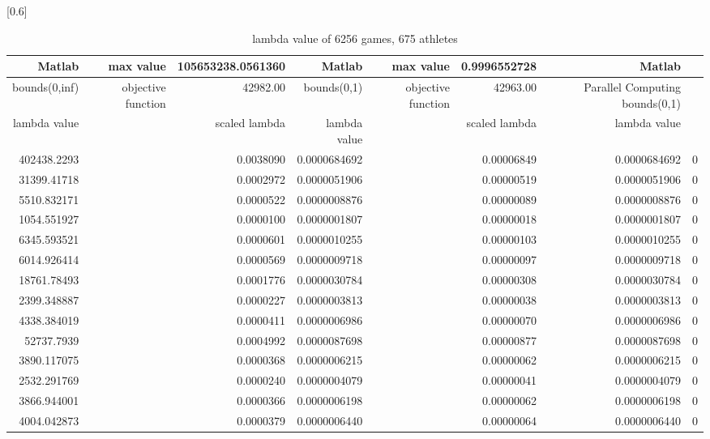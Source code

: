 \documentclass[
journal=jacsat, %
manuscript=article]{achemso}
\begin{document}
\begin{table}[htbp]
  \centering
  \caption{lambda value of 6256 games, 675 athletes}
  \scalebox{0.6}[0.6]{%
    \begin{tabular}{rrrrrrrr}
    \toprule
        Matlab & max value & 105653238.0561360 & Matlab & max value & 0.9996552728 & Matlab \\
    \hline
    bounds(0,inf) & objective function & 42982.00 & bounds(0,1) & objective function & 42963.00 &  Parallel Computing bounds(0,1) \\
    \hline
    lambda value &       & scaled lambda & lambda value  &       & scaled lambda & lambda value  \\
    \bottomrule
    402438.2293 &       & 0.0038090 & 0.0000684692 &       & 0.00006849 & 0.0000684692 & 0 \\
    31399.41718 &       & 0.0002972 & 0.0000051906 &       & 0.00000519 & 0.0000051906 & 0 \\
    5510.832171 &       & 0.0000522 & 0.0000008876 &       & 0.00000089 & 0.0000008876 & 0 \\
    1054.551927 &       & 0.0000100 & 0.0000001807 &       & 0.00000018 & 0.0000001807 & 0 \\
    6345.593521 &       & 0.0000601 & 0.0000010255 &       & 0.00000103 & 0.0000010255 & 0 \\
    6014.926414 &       & 0.0000569 & 0.0000009718 &       & 0.00000097 & 0.0000009718 & 0 \\
    18761.78493 &       & 0.0001776 & 0.0000030784 &       & 0.00000308 & 0.0000030784 & 0 \\
    2399.348887 &       & 0.0000227 & 0.0000003813 &       & 0.00000038 & 0.0000003813 & 0 \\
    4338.384019 &       & 0.0000411 & 0.0000006986 &       & 0.00000070 & 0.0000006986 & 0 \\
    52737.7939 &       & 0.0004992 & 0.0000087698 &       & 0.00000877 & 0.0000087698 & 0 \\
    3890.117075 &       & 0.0000368 & 0.0000006215 &       & 0.00000062 & 0.0000006215 & 0 \\
    2532.291769 &       & 0.0000240 & 0.0000004079 &       & 0.00000041 & 0.0000004079 & 0 \\
    3866.944001 &       & 0.0000366 & 0.0000006198 &       & 0.00000062 & 0.0000006198 & 0 \\
    4004.042873 &       & 0.0000379 & 0.0000006440 &       & 0.00000064 & 0.0000006440 & 0 \\

\end{tabular}}
\end{table}
\end{document}
